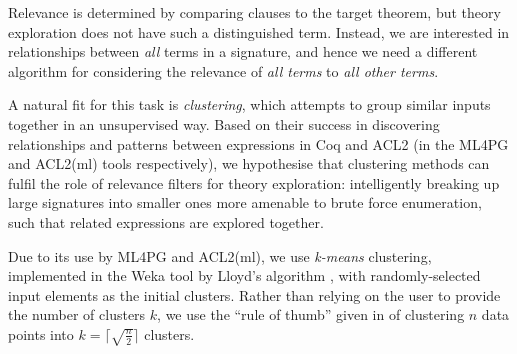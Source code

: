 Relevance is determined by comparing clauses to the target theorem, but theory exploration does not have such a distinguished term. Instead, we are interested in relationships between \emph{all} terms in a signature, and hence we need a different algorithm for considering the relevance of \emph{all terms} to \emph{all other terms}.

A natural fit for this task is \emph{clustering}, which attempts to group similar inputs together in an unsupervised way. Based on their success in discovering relationships and patterns between expressions in Coq and ACL2 (in the ML4PG and ACL2(ml) tools respectively), we hypothesise that clustering methods can fulfil the role of relevance filters for theory exploration: intelligently breaking up large signatures into smaller ones more amenable to brute force enumeration, such that related expressions are explored together.

Due to its use by ML4PG and ACL2(ml), we use \emph{k-means} clustering, implemented in the Weka tool \cite{Holmes.Donkin.Witten:1994} by Lloyd's algorithm \cite{lloyd1982least}, with randomly-selected input elements as the initial clusters. Rather than relying on the user to provide the number of clusters $k$, we use the ``rule of thumb'' given in \cite[pp. 365]{mardia1979multivariate} of clustering $n$ data points into $k = \lceil \sqrt{\frac{n}{2}} \rceil$ clusters.
